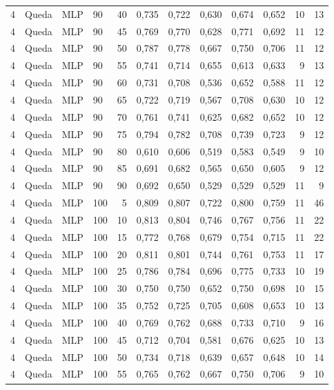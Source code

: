\begin{longtable}{ccclrrrrrrrr}
4 & Queda & MLP & 90 & 40 & 0,735 & 0,722 & 0,630 & 0,674 & 0,652 & 10 & 13 \\
4 & Queda & MLP & 90 & 45 & 0,769 & 0,770 & 0,628 & 0,771 & 0,692 & 11 & 12 \\
4 & Queda & MLP & 90 & 50 & 0,787 & 0,778 & 0,667 & 0,750 & 0,706 & 11 & 12 \\
4 & Queda & MLP & 90 & 55 & 0,741 & 0,714 & 0,655 & 0,613 & 0,633 & 9 & 13 \\
4 & Queda & MLP & 90 & 60 & 0,731 & 0,708 & 0,536 & 0,652 & 0,588 & 11 & 12 \\
4 & Queda & MLP & 90 & 65 & 0,722 & 0,719 & 0,567 & 0,708 & 0,630 & 10 & 12 \\
4 & Queda & MLP & 90 & 70 & 0,761 & 0,741 & 0,625 & 0,682 & 0,652 & 10 & 12 \\
4 & Queda & MLP & 90 & 75 & 0,794 & 0,782 & 0,708 & 0,739 & 0,723 & 9 & 12 \\
4 & Queda & MLP & 90 & 80 & 0,610 & 0,606 & 0,519 & 0,583 & 0,549 & 9 & 10 \\
4 & Queda & MLP & 90 & 85 & 0,691 & 0,682 & 0,565 & 0,650 & 0,605 & 9 & 12 \\
4 & Queda & MLP & 90 & 90 & 0,692 & 0,650 & 0,529 & 0,529 & 0,529 & 11 & 9 \\
4 & Queda & MLP & 100 & 5 & 0,809 & 0,807 & 0,722 & 0,800 & 0,759 & 11 & 46 \\
4 & Queda & MLP & 100 & 10 & 0,813 & 0,804 & 0,746 & 0,767 & 0,756 & 11 & 22 \\
4 & Queda & MLP & 100 & 15 & 0,772 & 0,768 & 0,679 & 0,754 & 0,715 & 11 & 22 \\
4 & Queda & MLP & 100 & 20 & 0,811 & 0,801 & 0,744 & 0,761 & 0,753 & 11 & 17 \\
4 & Queda & MLP & 100 & 25 & 0,786 & 0,784 & 0,696 & 0,775 & 0,733 & 10 & 19 \\
4 & Queda & MLP & 100 & 30 & 0,750 & 0,750 & 0,652 & 0,750 & 0,698 & 10 & 15 \\
4 & Queda & MLP & 100 & 35 & 0,752 & 0,725 & 0,705 & 0,608 & 0,653 & 10 & 13 \\
4 & Queda & MLP & 100 & 40 & 0,769 & 0,762 & 0,688 & 0,733 & 0,710 & 9 & 16 \\
4 & Queda & MLP & 100 & 45 & 0,712 & 0,704 & 0,581 & 0,676 & 0,625 & 10 & 13 \\
4 & Queda & MLP & 100 & 50 & 0,734 & 0,718 & 0,639 & 0,657 & 0,648 & 10 & 14 \\
4 & Queda & MLP & 100 & 55 & 0,765 & 0,762 & 0,667 & 0,750 & 0,706 & 9 & 10 \\

\end{longtable}
